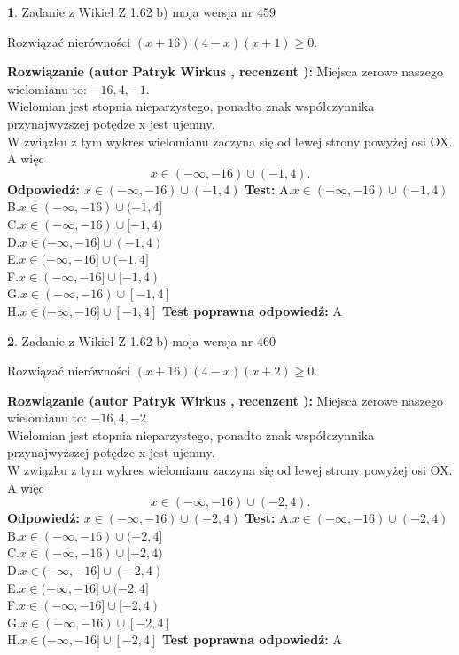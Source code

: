 \documentclass[12pt, a4paper]{article}
\theoremstyle{definition} %
\newtheorem{zad}{}
\newcommand{\zadStart}[1]{\begin{zad}#1\newline}
\newcommand{\zadStop}{\end{zad}}
\newcommand{\rozwStart}[2]{\noindent \textbf{Rozwiązanie (autor #1 , recenzent #2): }\newline}
\newcommand{\rozwStop}{\newline}
\newcommand{\odpStart}{\noindent \textbf{Odpowiedź:}\newline}
\newcommand{\odpStop}{\newline}
\newcommand{\testStart}{\noindent \textbf{Test:}\newline}
\newcommand{\testStop}{\newline}
\newcommand{\kluczStart}{\noindent \textbf{Test poprawna odpowiedź:}\newline}
\newcommand{\kluczStop}{\newline}
\begin{document}
\zadStart{Zadanie z Wikieł Z 1.62 b) moja wersja nr 459}

Rozwiązać nierówności $(x+16)(4-x)(x+1)\ge0$.
\zadStop
\rozwStart{Patryk Wirkus}{}
Miejsca zerowe naszego wielomianu to: $-16, 4, -1$.\\
Wielomian jest stopnia nieparzystego, ponadto znak współczynnika przy\linebreak najwyższej potędze x jest ujemny.\\ W związku z tym wykres wielomianu zaczyna się od lewej strony powyżej osi OX. A więc $$x \in (-\infty,-16) \cup (-1,4).$$
\rozwStop
\odpStart
$x \in (-\infty,-16) \cup (-1,4)$
\odpStop
\testStart
A.$x \in (-\infty,-16) \cup (-1,4)$\\
B.$x \in (-\infty,-16) \cup (-1,4]$\\
C.$x \in (-\infty,-16) \cup [-1,4)$\\
D.$x \in (-\infty,-16] \cup (-1,4)$\\
E.$x \in (-\infty,-16] \cup (-1,4]$\\
F.$x \in (-\infty,-16] \cup [-1,4)$\\
G.$x \in (-\infty,-16) \cup [-1,4]$\\
H.$x \in (-\infty,-16] \cup [-1,4]$
\testStop
\kluczStart
A
\kluczStop



\zadStart{Zadanie z Wikieł Z 1.62 b) moja wersja nr 460}

Rozwiązać nierówności $(x+16)(4-x)(x+2)\ge0$.
\zadStop
\rozwStart{Patryk Wirkus}{}
Miejsca zerowe naszego wielomianu to: $-16, 4, -2$.\\
Wielomian jest stopnia nieparzystego, ponadto znak współczynnika przy\linebreak najwyższej potędze x jest ujemny.\\ W związku z tym wykres wielomianu zaczyna się od lewej strony powyżej osi OX. A więc $$x \in (-\infty,-16) \cup (-2,4).$$
\rozwStop
\odpStart
$x \in (-\infty,-16) \cup (-2,4)$
\odpStop
\testStart
A.$x \in (-\infty,-16) \cup (-2,4)$\\
B.$x \in (-\infty,-16) \cup (-2,4]$\\
C.$x \in (-\infty,-16) \cup [-2,4)$\\
D.$x \in (-\infty,-16] \cup (-2,4)$\\
E.$x \in (-\infty,-16] \cup (-2,4]$\\
F.$x \in (-\infty,-16] \cup [-2,4)$\\
G.$x \in (-\infty,-16) \cup [-2,4]$\\
H.$x \in (-\infty,-16] \cup [-2,4]$
\testStop
\kluczStart
A
\kluczStop
\end{document}
